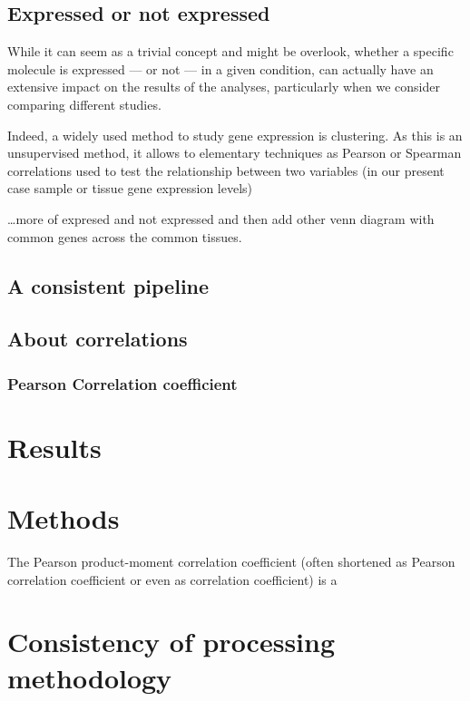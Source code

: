 \subsection{Expressed or not expressed}
\label{subsec:TransExpressedOrNot}
While it can seem as a trivial concept and might be overlook, whether a specific
molecule is expressed --- or not --- in a given condition, can actually have
an extensive impact on the results of the analyses, particularly when we consider
comparing different studies.

Indeed, a widely used method to study gene expression is clustering.
As this is an unsupervised method, it allows to
elementary techniques as Pearson or Spearman correlations used to test
the relationship between two variables (in our present case sample or tissue
gene expression levels)


\ldots more of expresed and not expressed and then add other venn diagram with 
common genes across the common tissues.



\subsection{A consistent pipeline}

\subsection{About correlations}

\subsubsection{Pearson Correlation coefficient}

\section{Results}\label{sec:Trans_Results}
\section{Methods}

The Pearson product-moment correlation coefficient (often shortened as
Pearson correlation coefficient or even as correlation coefficient) is a





\section{Consistency of processing methodology}\label{sec:Trans_consistentMethodo}

